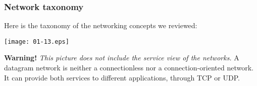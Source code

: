 %
\begin{frame}
\frametitle{Network taxonomy}

Here is the taxonomy of the networking concepts we reviewed:
\begin{center}
\texttt{[image: 01-13.eps]}
\end{center}
\textbf{Warning!} \emph{This picture does not include the service view
of the networks.} A datagram network is neither a connectionless nor a
connection-oriented network. It can provide both services to different
applications, through TCP or UDP.

\end{frame}
